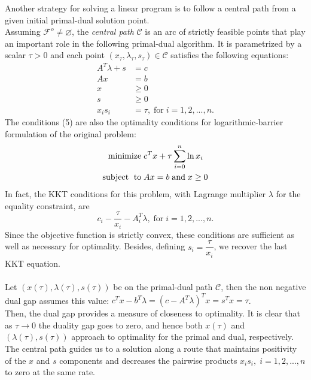 \documentclass[a4paper,10 pt,titlepage,twoside]{book}
\theoremstyle{plain}
\theoremstyle{definition}
\theoremstyle{remark}
\begin{document}
Another strategy for solving a linear program is to follow a central path from a given initial primal-dual solution point.\\ Assuming $\mathcal{F}^{o}\neq \varnothing$, the \textit{central path} $\mathcal{C}$ is an arc of strictly feasible points that play an important role in the following primal-dual algorithm. It is parametrized by a scalar $\tau  > 0$ and each point $(x_{\tau}, \lambda_{\tau}, s_{\tau})\in \mathcal{C}$ satisfies the following equations:
\begin{align}
A^{T}\lambda+s&=c\\
Ax&=b\\
x&\geq 0\\
s&\geq 0\\
x_{i}s_{i}&= \tau,\; \text{for}\;i= 1,2,...,n.
\end{align} 
The conditions (5) are also the optimality conditions for  logarithmic-barrier formulation of the original problem:
\begin{equation}
\begin{split}
\text{minimize\;} &c^{T}x + \tau\sum_{i=0}^{n}\ln{x_{i}}\\
\text{subject\; to\;}&Ax = b\;\text{and\;} x\geq0
\end{split}
\end{equation}
In fact, the KKT conditions for this problem, with Lagrange multiplier $\lambda$ for the equality constraint, are
\begin{equation*}
c_{i} - \dfrac{\tau}{x_{i}} - A^{T}_{i}\lambda,\; \text{for}\;i = 1,2,...,n.
\end{equation*}  
Since the objective function is strictly convex, these conditions are sufficient as well as necessary for optimality. Besides, defining $s_{i} = \dfrac{\tau}{x_{i}}$, we recover the last KKT equation.
\\
\\
Let $(x(\tau), \lambda(\tau), s(\tau))$ be on the primal-dual path $\mathcal{C}$, then the non negative dual gap assumes this value: $c^{T}x-b^{T}\lambda=\left(c-A^{T}\lambda\right)^{T}x=s^{T}x=\tau$.\\
Then, the dual gap provides a measure of closeness to optimality. It is clear that as $\tau\to0$ the duality gap goes to zero, and hence both $x(\tau)$ and
 $(\lambda(\tau), s(\tau))$ approach to optimality for the primal and dual, respectively. The central path guides us to a solution along a route that maintains positivity of the $x$ and $s$ components and decreases the pairwise products $x_{i}s_{i},\;i = 1,2,...,n$ to zero at the same rate.\\
\end{document}
